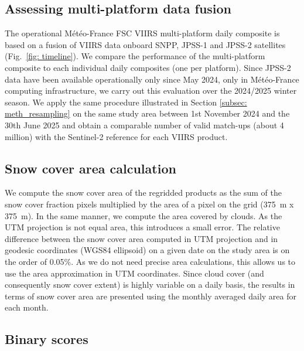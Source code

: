 \documentclass[tc, manuscript]{copernicus}
\begin{document}
\subsection{Assessing multi-platform data fusion}
\label{subsec: meth_compo}

The operational Météo-France FSC VIIRS multi-platform daily composite is based on a fusion of VIIRS data onboard SNPP, JPSS-1 and JPSS-2 satellites (Fig.~\ref{fig: timeline}).  We compare the performance of the multi-platform composite to each individual daily composites (one per platform). Since JPSS-2 data have been available operationally only since May 2024, only in Météo-France computing infrastructure, we carry out this evaluation over the 2024/2025 winter season. We apply the same procedure illustrated in Section \ref{subsec: meth_resampling} on the same study area between 1st November 2024 and the 30th June 2025 and obtain a comparable number of valid match-ups (about 4 million) with the Sentinel-2 reference for each VIIRS product. 

\subsection{Snow cover area calculation}

We compute the snow cover area of the regridded products as the sum of the snow cover fraction pixels multiplied by the area of a pixel on the grid (375~m x 375~m). In the same manner, we compute the area covered by clouds. As the UTM projection is not equal area, this introduces a small error. The relative difference between the snow cover area computed in UTM projection and in geodesic coordinates (WGS84 ellipsoid) on a given date on the study area is on the order of  0.05\%. As we do not need precise area calculations, this allows us to use the area approximation in UTM coordinates. Since cloud cover (and consequently snow cover extent) is highly variable on a daily basis, the results in terms of snow cover area are presented using the monthly averaged daily area for each month.

\subsection{Binary scores}
\label{subsec: methods_binary}
\end{document}
